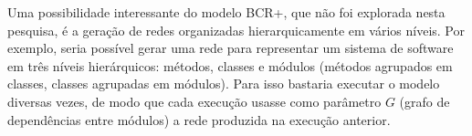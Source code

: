 
Uma possibilidade interessante do modelo BCR+, que não foi explorada nesta pesquisa, é a geração de redes organizadas hierarquicamente em vários níveis. Por exemplo, seria possível gerar uma rede para representar um sistema de software em três níveis hierárquicos: métodos, classes e módulos (métodos agrupados em classes, classes agrupadas em módulos). Para isso bastaria executar o modelo diversas vezes, de modo que cada execução usasse como parâmetro $G$ (grafo de dependências entre módulos) a rede produzida na execução anterior.



% 
